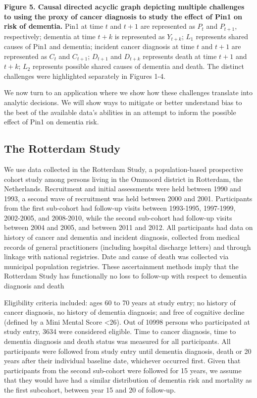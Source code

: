 \documentclass[
]{book}
\begin{document}
\textbf{Figure 5. Causal directed acyclic graph depicting multiple challenges to using the proxy of cancer diagnosis to study the effect of Pin1 on risk of dementia.} Pin1 at time \(t\) and \(t+1\) are represented as \(P_t\) and \(P_{t+1}\), respectively; dementia at time \(t+k\) is represented as \(Y_{t+k}\); \(L_1\) represents shared causes of Pin1 and dementia; incident cancer diagnosis at time \(t\) and \(t+1\) are represented as \(C_t\) and \(C_{t+1}\); \(D_{t+1}\) and \(D_{t+k}\) represents death at time \(t+1\) and \(t+k\); \(L_2\) represents possible shared causes of dementia and death. The distinct challenges were highlighted separately in Figures 1-4.

We now turn to an application where we show how these challenges translate into analytic decisions. We will show ways to mitigate or better understand bias to the best of the available data's abilities in an attempt to inform the possible effect of Pin1 on dementia risk.

\hypertarget{the-rotterdam-study}{%
\subsection{The Rotterdam Study}\label{the-rotterdam-study}}

We use data collected in the Rotterdam Study, a population-based prospective cohort study among persons living in the Ommoord district in Rotterdam, the Netherlands. Recruitment and initial assessments were held between 1990 and 1993, a second wave of recruitment was held between 2000 and 2001. Participants from the first sub-cohort had follow-up visits between 1993-1995, 1997-1999, 2002-2005, and 2008-2010, while the second sub-cohort had follow-up visits between 2004 and 2005, and between 2011 and 2012\autocite{ikram2020}. All participants had data on history of cancer and dementia and incident diagnosis, collected from medical records of general practitioners (including hospital discharge letters) and through linkage with national registries. Date and cause of death was collected via municipal population registries. These ascertainment methods imply that the Rotterdam Study has functionally no loss to follow-up with respect to dementia diagnosis and death

Eligibility criteria included: ages 60 to 70 years at study entry; no history of cancer diagnosis, no history of dementia diagnosis; and free of cognitive decline (defined by a Mini Mental Score \textless26). Out of 10998 persons who participated at study entry, 3634 were considered eligible. Time to cancer diagnosis, time to dementia diagnosis and death status was measured for all participants. All participants were followed from study entry until dementia diagnosis, death or 20 years after their individual baseline date, whichever occurred first. Given that participants from the second sub-cohort were followed for 15 years, we assume that they would have had a similar distribution of dementia risk and mortality as the first subcohort, between year 15 and 20 of follow-up.
\end{document}
